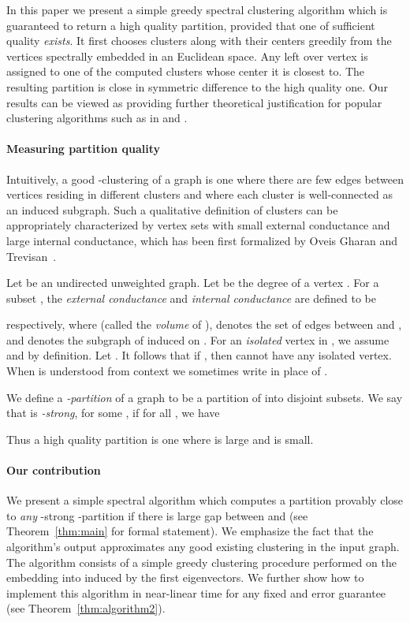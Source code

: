 \documentclass[11pt]{article}
\theoremstyle{plain}
\begin{document}
In this paper we present a simple greedy spectral clustering algorithm which is
guaranteed to return a high quality partition, provided that one of sufficient
quality {\em exists}. It first chooses  clusters along with their centers
greedily from the vertices spectrally embedded in an Euclidean space. Any left
over vertex is assigned to one of the computed clusters whose center it is
closest to. The resulting partition is close in symmetric difference to the high
quality one. Our results can be viewed as providing further theoretical
justification for popular clustering algorithms such as in
\cite{DBLP:conf/nips/BalakrishnanXKS11} and \cite{DBLP:conf/nips/NgJW01}.

\paragraph*{Measuring partition quality} Intuitively, a good -clustering
of a graph is one where there are few edges between vertices residing in
different clusters and where each cluster is well-connected as an induced
subgraph. Such a qualitative definition of clusters can be appropriately
characterized by vertex sets with small external conductance and large internal
conductance, which has been first formalized by Oveis Gharan and
Trevisan~\cite{DBLP:conf/soda/GharanT14}.

Let  be an undirected unweighted graph. Let  be the degree of a vertex . For a subset , the \emph{external
conductance} and \emph{internal conductance} are defined to be

respectively, where  (called the \emph{volume}
of ),  denotes the set of edges between  and , and
 denotes the subgraph of  induced on . For an {\em isolated} vertex
 in , we assume  and  by
definition. Let . It follows that if
, then  cannot have any isolated vertex. When  is
understood from context we sometimes write  in place of
.

We define a \emph{-partition} of a graph  to be a partition  of  into  disjoint subsets. We say that  is \emph{-strong}, for some
, if for all , we
have


Thus a high quality partition is one where  is large and
 is small.

\paragraph*{Our contribution} We present a simple spectral algorithm which
computes a partition provably close to {\em any} -strong -partition if there is large gap between
 and  (see Theorem~\ref{thm:main} for formal
statement). We emphasize the fact that the algorithm's output approximates any
good existing clustering in the input graph. The algorithm consists of a simple
greedy clustering procedure performed on the embedding into 
induced by the first  eigenvectors. We further show how to implement this
algorithm in near-linear time for any fixed  and error guarantee (see
Theorem~\ref{thm:algorithm2}).
\end{document}

